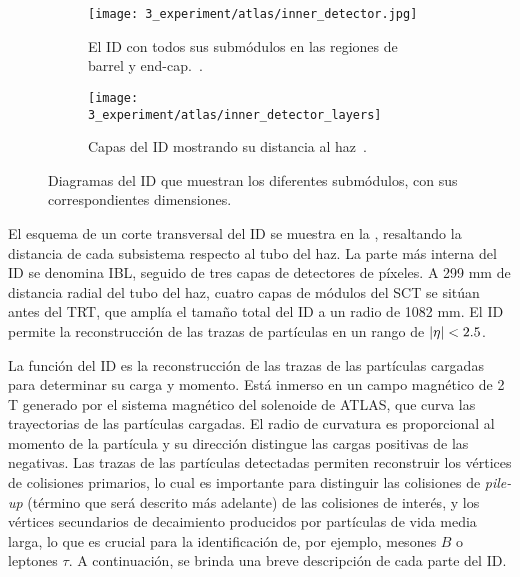 \begin{figure}[ht!]
    \centering
    \begin{subfigure}[t]{0.49\linewidth}
        \centering
        \texttt{[image: 3\_experiment/atlas/inner\_detector.jpg]}
        \caption{El \ac{ID} con todos sus submódulos en las regiones de barrel y end-cap.~\cite{ATLAS-InnerDetector}.}
        \label{fig:atlas:atlas:atlas_inner_detector:general}
    \end{subfigure}
    \hfill
    \begin{subfigure}[t]{0.49\linewidth}
        \centering
        \texttt{[image: 3\_experiment/atlas/inner\_detector\_layers]}
        \caption{Capas del \ac{ID} mostrando su distancia al haz~\cite{ATLAS-InnerDetector}.}
        \label{fig:atlas:atlas:atlas_inner_detector:layer_radius}
    \end{subfigure}
    \caption{Diagramas del \ac{ID} que muestran los diferentes submódulos, con sus correspondientes dimensiones.}
    \label{fig:atlas:atlas:atlas_inner_detector}
\end{figure}

El esquema de un corte transversal del \acf{ID} \cite{ATLAS-ID-TDR} se muestra en la \Fig{\ref{fig:atlas:atlas:atlas_inner_detector}}, resaltando la distancia de cada subsistema respecto al tubo del haz. La parte más interna del \ac{ID} se denomina \ac{IBL}, seguido de tres capas de detectores de píxeles. A 299 mm de distancia radial del tubo del haz, cuatro capas de módulos del \ac{SCT} se sitúan antes del \ac{TRT}, que amplía el tamaño total del \ac{ID} a un radio de 1082 mm. El \ac{ID} permite la reconstrucción de las trazas de partículas en un rango de $|\eta| < 2.5$.


La función del \ac{ID} es la reconstrucción de las trazas de las partículas cargadas para determinar su carga y momento. Está inmerso en un campo magnético de 2 T generado por el sistema magnético del solenoide de \ac{ATLAS}, que curva las trayectorias de las partículas cargadas. El radio de curvatura es proporcional al momento de la partícula y su dirección distingue las cargas positivas de las negativas. Las trazas de las partículas detectadas permiten reconstruir los vértices de colisiones primarios, lo cual es importante para distinguir las colisiones de \textit{pile-up} (término que será descrito más adelante) de las colisiones de interés, y los vértices secundarios de decaimiento producidos por partículas de vida media larga, lo que es crucial para la identificación de, por ejemplo, mesones \(B\) o leptones \(\tau\). A continuación, se brinda una breve descripción de cada parte del \ac{ID}.


